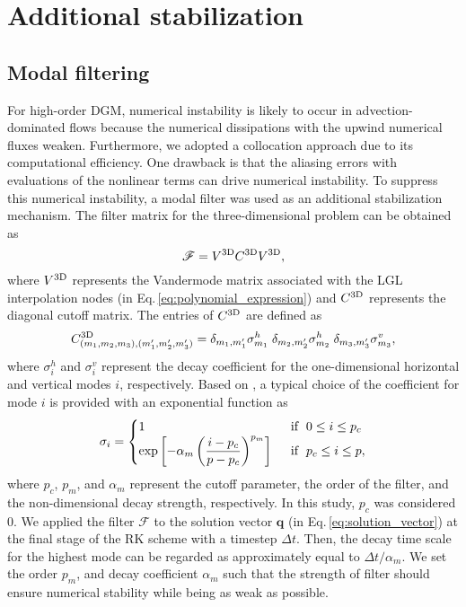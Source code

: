 \section{Additional stabilization}
\subsection{Modal filtering}

For high-order DGM, 
numerical instability is likely to occur in advection-dominated flows 
because the numerical dissipations with the upwind numerical fluxes weaken. 
Furthermore, 
we adopted a collocation approach due to its computational efficiency. 
One drawback is that 
the aliasing errors with evaluations of the nonlinear terms can drive numerical instability. 
To suppress this numerical instability, 
a modal filter was used as an additional stabilization mechanism. 
The filter matrix for the three-dimensional problem can be obtained as 
\begin{equation}
  \mathscr{F} =  V^{\rm 3D} C^{\rm 3D} V^{\rm 3D},   
\end{equation}
where 
$V^{\rm 3D}$ represents the Vandermode matrix associated with the LGL interpolation nodes (in Eq.\,\eqref{eq:polynomial_expression}) 
and  
$C^{\rm 3D}$ represents the diagonal cutoff matrix. 
The entries of $C^{\rm 3D}$ are defined as
\begin{equation}
  C^{\rm 3D}_{(m_1,m_2,m_3),(m'_1,m'_2,m'_3)} 
 = 
 \delta_{m_1,m'_1} \sigma^h_{m_1} \;
 \delta_{m_2,m'_2} \sigma^h_{m_2} \;
 \delta_{m_3,m'_3} \sigma^v_{m_3}, 
\end{equation}
where
$\sigma^h_i$ and $\sigma^v_i$ represent 
the decay coefficient for the one-dimensional horizontal and vertical modes $i$, respectively. 
Based on \cite{hesthaven2007nodal}, 
a typical choice of the coefficient for mode $i$ is provided 
with an exponential function as 
\begin{align}
 \sigma_i = \begin{cases}
   1 \;\; &{\rm if}\;\;  0 \leq i \leq p_c  \\
   \exp \left[-\alpha_m \left( \dfrac{i-p_c}{p-p_c} \right)^{p_m} \right] \;\; &{\rm if} \;\; p_c \leq i \leq p, 
 \end{cases}
\label{eq:modal_filter_coefficient}
\end{align}
where 
$p_c$, $p_m$, and $\alpha_m$ represent the cutoff parameter, 
the order of the filter, and the non-dimensional decay strength, respectively. 
In this study, $p_c$ was considered 0. 
We applied the filter $\mathscr{F}$ to the solution vector $\bm{q}$ (in Eq.\,\eqref{eq:solution_vector})
at the final stage of the RK scheme with a timestep $\Delta t$. 
Then, the decay time scale for the highest mode can be regarded as approximately equal to $\Delta t/\alpha_m$. 
We set the order $p_m$, and decay coefficient $\alpha_m$ such that 
the strength of filter should ensure numerical stability while being as weak as possible. 


